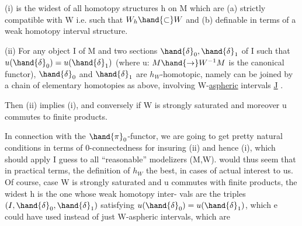(i)    is the widest of all homotopy structures  h on M which are
(a)   strictly compatible with W  i.e. such that $W_h\hand{\subset}W$  and 
(b)  definable in terms of a weak homotopy interval structure.

(ii)  For any object I of M and two sections $\hand{\delta}_0,\hand{\delta}_1$ of I such that
$u(\hand{\delta}_0)=u(\hand{\delta}_1)$  (where u: $M\hand{\rightarrow}W^{-1}M$ is the canonical functor), $\hand{\delta}_0$ and $\hand{\delta}_1$ are
$h_W$-homotopic,  namely can be joined by a chain of elementary homotopies
as above,  involving  W-\uline{aspheric}\hand{*} intervals \underline{J} .

Then (ii) implies (i),  and conversely if W is strongly saturated\hand{,}
and moreover u commutes to finite products.

In connection with the $\hand{\pi}_0$-functor,  we are going to get pretty
natural conditions  in terms of 0-connectedness for insuring (ii)
and hence (i),  which should apply I guess to all ``reasonable'' modelizers
(M,W).     would thus seem that  in practical terms,
the definition of $h_W$  the best,  in  cases of actual interest to us.
Of course,   case W is strongly saturated and u commutes with finite
products,  the widest h is the one  whose weak homotopy inter-%
vals are the triples $(I,\hand{\delta}_0,\hand{\delta}_1)$  satisfying $u(\hand{\delta}_0) = u(\hand{\delta}_1)$,  which e could
have used instead of just W-aspheric intervals,   which are

